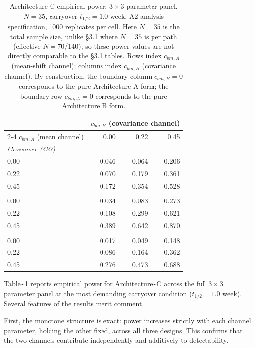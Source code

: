 \documentclass[
  11pt,
]{article}
\begin{document}
\begin{table}[h]
\small\centering
\caption{Architecture C empirical power: $3 \times 3$ parameter
panel. $N = 35$, carryover $t_{1/2} = 1.0$ week, A2 analysis
specification, 1000 replicates per cell. Here $N = 35$ is the
total sample size, unlike \S3.1 where $N = 35$ is per path
(effective $N = 70$/140), so these power values are not directly
comparable to the \S3.1 tables. Rows index $c_{bm,A}$
(mean-shift channel); columns index $c_{bm,B}$ (covariance
channel). By construction, the boundary column $c_{bm,B} = 0$
corresponds to the pure Architecture A form; the boundary row
$c_{bm,A} = 0$ corresponds to the pure Architecture B form.}
\label{tab:arch-c-power}
\begin{tabular}{lrrr}
\toprule
& \multicolumn{3}{c}{$c_{bm,B}$ (covariance channel)} \\
\cmidrule(l){2-4}
$c_{bm,A}$ (mean channel) & 0.00 & 0.22 & 0.45 \\
\midrule
\multicolumn{4}{l}{\textit{Crossover (CO)}} \\
0.00 & 0.046 & 0.064 & 0.206 \\
0.22 & 0.070 & 0.179 & 0.361 \\
0.45 & 0.172 & 0.354 & 0.528 \\
\addlinespace
\multicolumn{4}{l}{\textit{Hybrid}} \\
0.00 & 0.034 & 0.083 & 0.273 \\
0.22 & 0.108 & 0.299 & 0.621 \\
0.45 & 0.389 & 0.642 & 0.870 \\
\addlinespace
\multicolumn{4}{l}{\textit{OL+BDC}} \\
0.00 & 0.017 & 0.049 & 0.148 \\
0.22 & 0.086 & 0.164 & 0.362 \\
0.45 & 0.276 & 0.473 & 0.688 \\
\bottomrule
\end{tabular}
\end{table}

Table\textasciitilde{}\ref{tab:arch-c-power} reports empirical power for
Architecture\textasciitilde C across the full \(3 \times 3\) parameter
panel at the most demanding carryover condition (\(t_{1/2} = 1.0\)
week). Several features of the results merit comment.

First, the monotone structure is exact: power increases strictly with
each channel parameter, holding the other fixed, across all three
designs. This confirms that the two channels contribute independently
and additively to detectability.
\end{document}
